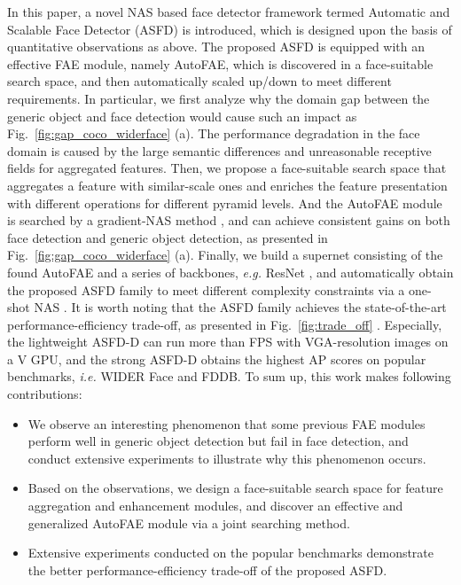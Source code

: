 \documentclass[sigconf]{acmart}
\begin{document}
In this paper, a novel NAS based face detector framework termed Automatic and Scalable Face Detector (ASFD) is introduced, which is designed upon the basis of quantitative observations as above. 
The proposed ASFD is equipped with an effective FAE module, namely AutoFAE, which is discovered in a face-suitable search space, and then automatically scaled up/down to meet different requirements.
In particular, we first analyze why the domain gap between the generic object and face detection would cause such an impact as Fig.~\ref{fig:gap_coco_widerface} (a). The performance degradation in the face domain is caused by the large semantic differences and unreasonable receptive fields for aggregated features.
Then, we propose a face-suitable search space that aggregates a feature with similar-scale ones and enriches the feature presentation with different operations for different pyramid levels. And the AutoFAE module is searched by a gradient-NAS method \cite{liu2018darts,xu2019pcdarts}, and can achieve consistent gains on both face detection and generic object detection, as presented in Fig.~\ref{fig:gap_coco_widerface} (a). 
Finally, we build a supernet consisting of the found AutoFAE and a series of backbones, \textit{e.g.} ResNet \cite{he2016resnet}, and automatically obtain the proposed ASFD family to meet different complexity constraints via a one-shot NAS \cite{guo2019spos,chu2019fairnas}.
It is worth noting that the ASFD family achieves the state-of-the-art performance-efficiency trade-off, as presented in Fig.~\ref{fig:trade_off} \cite{yoo2019extd,chi2019srn,tang2018pyramidbox,li2019dsfd,zhang2020refineface}. Especially, the lightweight ASFD-D can run more than  FPS with VGA-resolution images on a V GPU, and the strong ASFD-D obtains the highest AP scores on popular benchmarks, \textit{i.e.} WIDER Face and FDDB. To sum up, this work makes following contributions:


\begin{itemize}
\item We observe an interesting phenomenon that some previous FAE modules perform well in generic object detection but fail in face detection, and conduct extensive experiments to illustrate why this phenomenon occurs.
    \item Based on the observations, we design a face-suitable search space for feature aggregation and enhancement modules, and discover an effective and generalized AutoFAE module via a joint searching method.
    \item Extensive experiments conducted on the popular benchmarks demonstrate the better performance-efficiency trade-off of the proposed ASFD.
\end{itemize}
\end{document}
